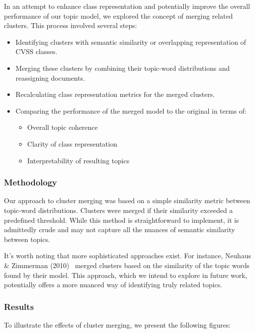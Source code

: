In an attempt to enhance class representation and potentially improve the overall performance of our topic model, we explored the concept of merging related clusters. This process involved several steps:

\begin{itemize}
	\item Identifying clusters with semantic similarity or overlapping representation of CVSS classes.
	\item Merging these clusters by combining their topic-word distributions and reassigning documents.
	\item Recalculating class representation metrics for the merged clusters.
	\item Comparing the performance of the merged model to the original in terms of:
	      \begin{itemize}
		      \item Overall topic coherence
		      \item Clarity of class representation
		      \item Interpretability of resulting topics
	      \end{itemize}
\end{itemize}

\subsubsection{Methodology}

Our approach to cluster merging was based on a simple similarity metric between topic-word distributions. Clusters were merged if their similarity exceeded a predefined threshold. While this method is straightforward to implement, it is admittedly crude and may not capture all the nuances of semantic similarity between topics.

It's worth noting that more sophisticated approaches exist. For instance, Neuhaus \& Zimmerman (2010)~\cite{cve_topic_modelling} merged clusters based on the similarity of the topic words found by their model. This approach, which we intend to explore in future work, potentially offers a more nuanced way of identifying truly related topics.

\subsubsection{Results}

To illustrate the effects of cluster merging, we present the following figures:

